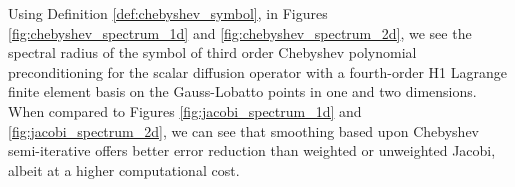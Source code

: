 Using Definition \ref{def:chebyshev_symbol}, in Figures \ref{fig:chebyshev_spectrum_1d} and \ref{fig:chebyshev_spectrum_2d}, we see the spectral radius of the symbol of third order Chebyshev polynomial preconditioning for the scalar diffusion operator with a fourth-order H1 Lagrange finite element basis on the Gauss-Lobatto points in one and two dimensions.
When compared to Figures \ref{fig:jacobi_spectrum_1d} and \ref{fig:jacobi_spectrum_2d}, we can see that smoothing based upon Chebyshev semi-iterative offers better error reduction than weighted or unweighted Jacobi, albeit at a higher computational cost.
